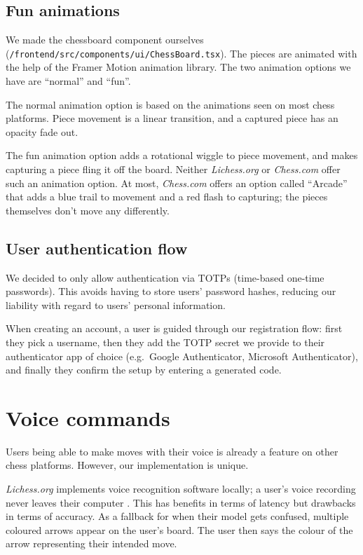 \documentclass[12pt,titlepage,a4paper]{article}
\begin{document}
    \subsection{Fun animations}

    We made the chessboard component ourselves (\texttt{/frontend/src/components/ui/ChessBoard.tsx}). The pieces are animated with the help of the Framer Motion animation library. The two animation options we have are ``normal'' and ``fun''.

    The normal animation option is based on the animations seen on most chess platforms. Piece movement is a linear transition, and a captured piece has an opacity fade out.

    The fun animation option adds a rotational wiggle to piece movement, and makes capturing a piece fling it off the board. Neither \textit{Lichess.org} or \textit{Chess.com} offer such an animation option. At most, \textit{Chess.com} offers an option called ``Arcade'' that adds a blue trail to movement and a red flash to capturing; the pieces themselves don't move any differently.

    \subsection{User authentication flow}
    \label{user-authentication-flow}

    We decided to only allow authentication via TOTPs (time-based one-time passwords).
    This avoids having to store users' password hashes, reducing our liability with regard to users' personal information.

    When creating an account, a user is guided through our registration flow: first they pick a username, then they add the TOTP secret we provide to their authenticator app of choice (e.g.\ Google Authenticator, Microsoft Authenticator), and finally they confirm the setup by entering a generated code.


    \section{Voice commands}
    \label{Voice commands}

    Users being able to make moves with their voice is already a feature on other chess platforms. However, our implementation is unique.

    \textit{Lichess.org} implements voice recognition software locally; a user's voice recording never leaves their computer \citep{lichess-voice}. This has benefits in terms of latency but drawbacks in terms of accuracy. As a fallback for when their model gets confused, multiple coloured arrows appear on the user's board. The user then says the colour of the arrow representing their intended move.
\end{document}
